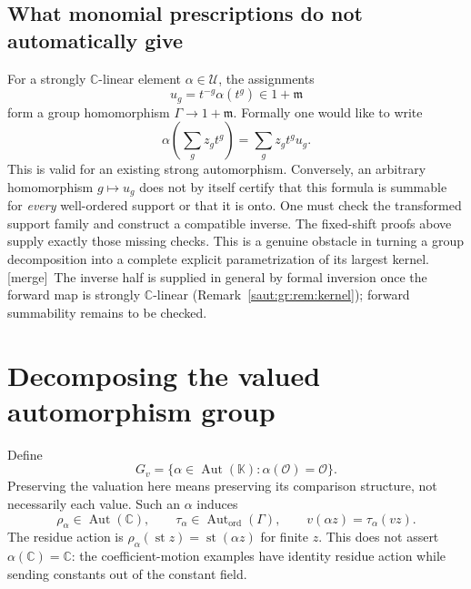 \documentclass[11pt]{article}
\theoremstyle{definition}
\theoremstyle{remark}
\newcommand{\C}{\mathbb C}
\newcommand{\K}{\mathbb K}
\newcommand{\OO}{\mathcal O}
\newcommand{\mm}{\mathfrak m}
\newcommand{\U}{\mathcal U}
\newcommand{\Aut}{\operatorname{Aut}}
\newcommand{\st}{\operatorname{st}}
\newcommand{\Gh}{\operatorname{Aut}_{\mathrm{ord}}(\Gamma)}
\newcommand{\mergetag}{\textup{[merge]}}
\numberwithin{equation}{section}
\begin{document}
\subsection{What monomial prescriptions do not automatically give}

For a strongly $\C$-linear element $\alpha\in\U$, the assignments
\[
 u_g=t^{-g}\alpha(t^g)\in1+\mm
\]
form a group homomorphism $\Gamma\to1+\mm$. Formally one would like to write
\[
 \alpha\left(\sum_g z_gt^g\right)=\sum_g z_gt^g u_g.
\]
This is valid for an existing strong automorphism. Conversely, an arbitrary
homomorphism $g\mapsto u_g$ does not by itself certify that this formula is
summable for \emph{every} well-ordered support or that it is onto.
One must check the transformed support family and construct a compatible
inverse. The fixed-shift proofs above supply exactly those missing checks.
This is a genuine obstacle in turning a group decomposition into a complete
explicit parametrization of its largest kernel. \mergetag\ The inverse half is
supplied in general by formal inversion once the forward map is strongly
$\C$-linear (Remark~\ref{saut:gr:rem:kernel}); forward summability remains to be
checked.

\section{Decomposing the valued automorphism group}\label{saut:sec:decomposition}

Define
\[
 G_v=\{\alpha\in\Aut(\K):\alpha(\OO)=\OO\}.
\]
Preserving the valuation here means preserving its comparison structure,
not necessarily each value. Such an $\alpha$ induces
\[
 \rho_\alpha\in\Aut(\C),\qquad
 \tau_\alpha\in\Gh,
 \qquad
 v(\alpha z)=\tau_\alpha(vz).
\]
The residue action is $\rho_\alpha(\st z)=\st(\alpha z)$ for finite $z$.
This does not assert $\alpha(\C)=\C$: the coefficient-motion examples have
identity residue action while sending constants out of the constant field.
\end{document}
